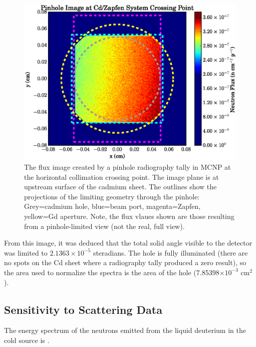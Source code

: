 \documentclass[preprint,12pt]{elsarticle}
\begin{document}
\begin{figure}[h!] 
  \centering
    \includegraphics[width=\columnwidth]{graphics/pinhole.eps}
     \caption{The flux image created by a pinhole radiography tally in MCNP at the horizontal collimation crossing point.  The image plane is at upstream surface of the cadmium sheet.  The outlines show the projections of the limiting geometry through the pinhole: Grey=cadmium hole, blue=beam port, magenta=Zapfen, yellow=Gd aperture.  Note, the flux vlaues shown are those resulting from a pinhole-limited view (not the real, full view).  \label{fig:pinhole_image}}
\end{figure}

From this image, it was deduced that the total solid angle visible to the detector was limited to $2.1363\times10^{-5}$ steradians.  The hole is fully illuminated (there are no spots on the Cd sheet where a radiography tally produced a zero result), so the area used to normalize the spectra is the area of the hole (7.85398$\times 10^{-3}$ cm$^2$).

\subsection{Sensitivity to Scattering Data}
\label{subsec:data}

The energy spectrum of the neutrons emitted from the liquid deuterium in the cold source is \cite{granada_d2,granada_d2o_1,granada_d2o_2,granada_d2o_3}.
\end{document}

